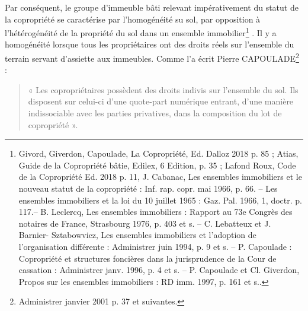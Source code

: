 			Par conséquent, le groupe d’immeuble bâti relevant impérativement du statut de la copropriété se
			caractérise par l’homogénéité su sol, par opposition à l’hétérogénéité de la propriété du sol dans un
			ensemble immobilier\footnote{
			Givord, Giverdon, Capoulade, La Copropriété, Ed. Dalloz 2018 p. 85 ; Atias, Guide de la Copropriété bâtie, Edilex, 6\degre{} Edition, p. 35 ;
			Lafond Roux, Code de la Copropriété Ed. 2018 p. 11, J. Cabanac, Les ensembles immobiliers et le nouveau statut de la copropriété : Inf.
			rap. copr. mai 1966, p. 66. – Les ensembles immobiliers et la loi du 10 juillet 1965 : Gaz. Pal. 1966, 1, doctr. p. 117.– B. Leclercq, Les
			ensembles immobiliers : Rapport au 73e Congrès des notaires de France, Strasbourg 1976, p. 403 et s. – C. Lebatteux et J. Barnier-
			Sztabowvicz, Les ensembles immobiliers et l'adoption de l'organisation différente : Administrer juin 1994, p. 9 et s. – P. Capoulade :
			Copropriété et structures foncières dans la jurisprudence de la Cour de cassation : Administrer janv. 1996, p. 4 et s. – P. Capoulade et
			Cl. Giverdon, Propos sur les ensembles immobiliers : RD imm. 1997, p. 161 et s..
			} . Il y a homogénéité lorsque tous les propriétaires ont des droits réels sur
			l'ensemble du terrain servant d'assiette aux immeubles. Comme l’a écrit Pierre CAPOULADE\footnote{Administrer janvier 2001  p. 37 et suivantes.} :
			\begin{quote}
				« Les copropriétaires possèdent des droits indivis sur l’ensemble du sol. Ils disposent sur celui-ci d’une
				quote-part numérique entrant, d’une manière indissociable avec les parties privatives, dans la composition
				du lot de copropriété ».
			\end{quote}
	

